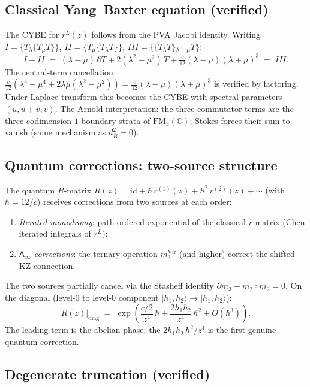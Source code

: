 \documentclass[11pt]{article}
\newcommand{\barB}{\overline{B}}
\newcommand{\C}{\mathbb{C}}
\newcommand{\Ainf}{\mathsf{A}_{\infty}}
\newcommand{\FM}{\mathrm{FM}}
\newcommand{\id}{\mathrm{id}}
\begin{document}
\subsection*{Classical Yang--Baxter equation (verified)}

The CYBE for $r^L(z)$ follows from the PVA Jacobi identity.
Writing $I = \{T{}_\lambda\{T{}_\mu T\}\}$,
$II = \{T{}_\mu\{T{}_\lambda T\}\}$,
$III = \{\{T{}_\lambda T\}{}_{\lambda+\mu} T\}$:
\[
I - II
\;=\;
(\lambda-\mu)\,\partial T
+ 2(\lambda^2-\mu^2)\,T
+ \tfrac{c}{12}(\lambda-\mu)(\lambda+\mu)^3
\;=\; III.
\]
The central-term cancellation
$\frac{c}{12}(\lambda^4 - \mu^4 + 2\lambda\mu(\lambda^2 - \mu^2))
= \frac{c}{12}(\lambda-\mu)(\lambda+\mu)^3$
is verified by factoring.  Under Laplace transform this becomes the
CYBE with spectral parameters $(u, u+v, v)$.  The Arnold
interpretation: the three commutator terms are the three
codimension-$1$ boundary strata of $\FM_3(\C)$; Stokes forces their
sum to vanish (same mechanism as $d_{\barB}^2 = 0$).

\subsection*{Quantum corrections: two-source structure}

The quantum $R$-matrix $R(z) = \id + \hbar\,r^{(1)}(z)
+ \hbar^2\,r^{(2)}(z) + \cdots$ (with $\hbar = 12/c$) receives
corrections from two sources at each order:
\begin{enumerate}[label=(\roman*)]
\item \emph{Iterated monodromy}: path-ordered exponential of the
  classical $r$-matrix (Chen iterated integrals of $r^L$);
\item \emph{$\Ainf$ corrections}: the ternary operation
  $m_3^{\mathrm{Vir}}$ (and higher) correct the shifted KZ
  connection.
\end{enumerate}
The two sources partially cancel via the Stasheff identity
$\partial m_3 + m_2 \circ m_2 = 0$.  On the diagonal
(level-$0$ to level-$0$ component
$|h_1,h_2\rangle \to |h_1,h_2\rangle$):
\begin{equation}\label{eq:R-level0-rectified}
R(z)\big|_{\mathrm{diag}}
\;=\;
\exp\!\left(
  \frac{c/2}{z^4}\,\hbar
  + \frac{2h_1 h_2}{z^4}\,\hbar^2
  + O(\hbar^3)
\right).
\end{equation}
The leading term is the abelian phase; the $2h_1 h_2\,\hbar^2/z^4$
is the first genuine quantum correction.

\subsection*{Degenerate truncation (verified)}
\end{document}
